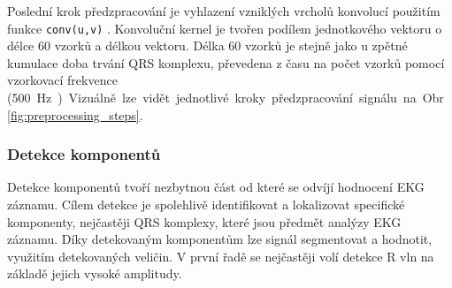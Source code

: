 Poslední krok předzpracování je vyhlazení vzniklých vrcholů konvolucí použitím
funkce \texttt{conv(u,v)} \cite{matlabCONV}. Konvoluční kernel je tvořen podílem
jednotkového vektoru o délce 60 vzorků a délkou vektoru. Délka 60 vzorků je
stejně jako u zpětné kumulace doba trvání QRS komplexu, převedena z času na
počet vzorků pomocí vzorkovací frekvence (500~\si\Hz). Vizuálně lze vidět
jednotlivé kroky předzpracování signálu na Obr. \ref{fig:preprocessing_steps}.

\subsubsection{Detekce komponentů}
\label{section:components_detection}
Detekce komponentů tvoří nezbytnou část od které se odvíjí hodnocení EKG
záznamu. Cílem detekce je spolehlivě identifikovat a lokalizovat specifické
komponenty, nejčastěji QRS komplexy, které jsou předmět analýzy EKG záznamu.
Díky detekovaným komponentům lze signál segmentovat a hodnotit, využitím
detekovaných veličin. V první řadě se nejčastěji volí detekce R vln na základě
jejich vysoké amplitudy.

